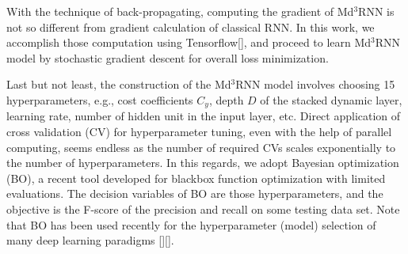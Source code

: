 With the technique of back-propagating, computing the gradient of Md$^3$RNN is not so different from gradient calculation of classical RNN. In this work, we accomplish those computation using Tensorflow[], and proceed to learn Md$^3$RNN model by stochastic gradient descent for overall loss minimization.

Last but not least, the construction of the Md$^3$RNN model involves choosing 15 hyperparameters, e.g., cost coefficients $C_{y}$, depth $D$ of the stacked dynamic layer, learning rate, number of hidden unit in the input layer, etc. Direct application of cross validation (CV) for hyperparameter tuning, even with the help of parallel computing, seems endless as the number of required CVs scales exponentially to the number of hyperparameters. In this regards, we adopt Bayesian optimization (BO), a recent tool developed for blackbox function optimization with limited evaluations. The decision variables of BO are those hyperparameters, and the objective is the F-score of the precision and recall on some testing data set. Note that BO has been used recently for the hyperparameter (model) selection of many deep learning paradigms [][].            



